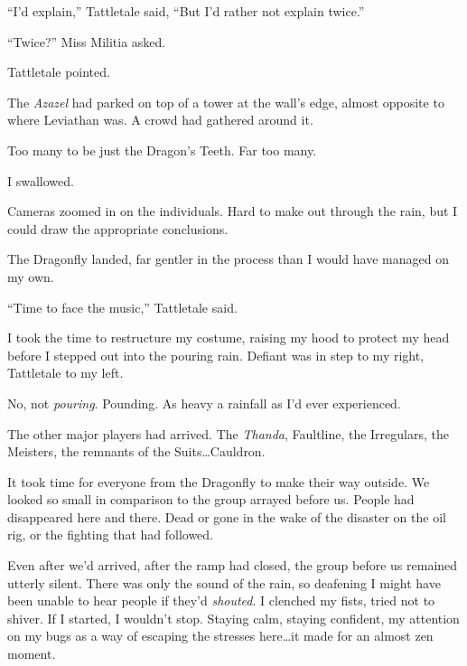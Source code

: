 ``I'd explain,'' Tattletale said, ``But I'd rather not explain twice.''



``Twice?''  Miss Militia asked.



Tattletale pointed.



The \emph{Azazel }had parked on top of a tower at the wall's edge, almost opposite to where Leviathan was.  A crowd had gathered around it.



Too many to be just the Dragon's Teeth.  Far too many.



I swallowed.



Cameras zoomed in on the individuals.  Hard to make out through the rain, but I could draw the appropriate conclusions.



The Dragonfly landed, far gentler in the process than I would have managed on my own.



``Time to face the music,'' Tattletale said.



I took the time to restructure my costume, raising my hood to protect my head before I stepped out into the pouring rain.  Defiant was in step to my right, Tattletale to my left.



No, not \emph{pouring}.  Pounding.  As heavy a rainfall as I'd ever experienced.



The other major players had arrived.  The \emph{Thanda}, Faultline, the Irregulars, the Meisters, the remnants of the Suits\ldots  Cauldron.



It took time for everyone from the Dragonfly to make their way outside.  We looked so small in comparison to the group arrayed before us.  People had disappeared here and there.  Dead or gone in the wake of the disaster on the oil rig, or the fighting that had followed.



Even after we'd arrived, after the ramp had closed, the group before us remained utterly silent.  There was only the sound of the rain, so deafening I might have been unable to hear people if they'd \emph{shouted}.  I clenched my fists, tried not to shiver.  If I started, I wouldn't stop.  Staying calm, staying confident, my attention on my bugs as a way of escaping the stresses here\ldots it made for an almost zen moment.



